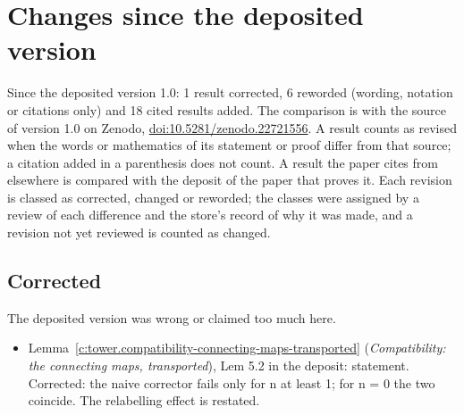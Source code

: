 \documentclass[11pt]{article}
\theoremstyle{definition}
\theoremstyle{plain}
\begin{document}
\section*{Changes since the deposited version}
Since the deposited version 1.0: 1 result corrected, 6 reworded (wording, notation or citations only) and 18 cited results added. The comparison is with the source of version 1.0 on Zenodo, \href{https://doi.org/10.5281/zenodo.22721556}{doi:10.5281/zenodo.22721556}. A result counts as revised when the words or mathematics of its statement or proof differ from that source; a citation added in a parenthesis does not count. A result the paper cites from elsewhere is compared with the deposit of the paper that proves it. Each revision is classed as corrected, changed or reworded; the classes were assigned by a review of each difference and the store's record of why it was made, and a revision not yet reviewed is counted as changed.
\subsection*{Corrected}
The deposited version was wrong or claimed too much here.
\begin{itemize}\setlength{\itemsep}{2pt}
\item Lemma~\ref{c:tower.compatibility-connecting-maps-transported} (\emph{Compatibility: the connecting maps, transported}), Lem 5.2 in the deposit: statement. Corrected: the naive corrector fails only for n at least 1; for n = 0 the two coincide. The relabelling effect is restated.
\end{itemize}
\end{document}
